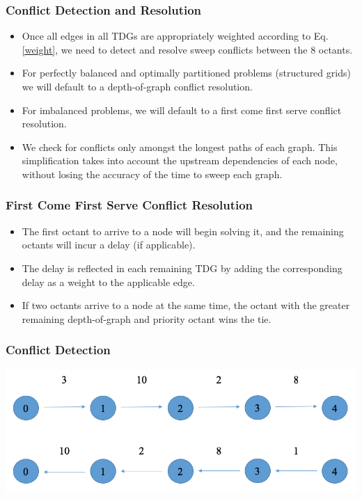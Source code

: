 \documentclass[xcolor={usenames,dvipsnames,svgnames,table}]{beamer}
\begin{document}
\begin{frame}[t]\frametitle{Conflict Detection and Resolution}
\begin{block}{}
\begin{itemize}
	\item Once all edges in all TDGs are appropriately weighted according to Eq. \ref{weight}, we need to detect and resolve sweep conflicts between the 8 octants.
	\item For perfectly balanced and optimally partitioned problems (structured grids) we will default to a depth-of-graph conflict resolution.
	\item For imbalanced problems, we will default to a first come first serve conflict resolution.
    \item We check for conflicts only amongst the longest paths of each graph. This simplification takes into account the upstream dependencies of each node, without losing the accuracy of the time to sweep each graph.
\end{itemize}
\end{block}
\end{frame}

\begin{frame}[t]\frametitle{First Come First Serve Conflict Resolution}
\begin{block}{}
\begin{itemize}
	\item The first octant to arrive to a node will begin solving it, and the remaining octants will incur a delay (if applicable).
	\item The delay is reflected in each remaining TDG by adding the corresponding delay as a weight to the applicable edge.
	\item If two octants arrive to a node at the same time, the octant with the greater remaining depth-of-graph and priority octant wins the tie.
\end{itemize}
\end{block}
\end{frame}

\begin{frame}[t]\frametitle{Conflict Detection}
	\centering
 	\includegraphics[scale=0.35]{figures/preconflict.png}
\end{frame}
\end{document}
